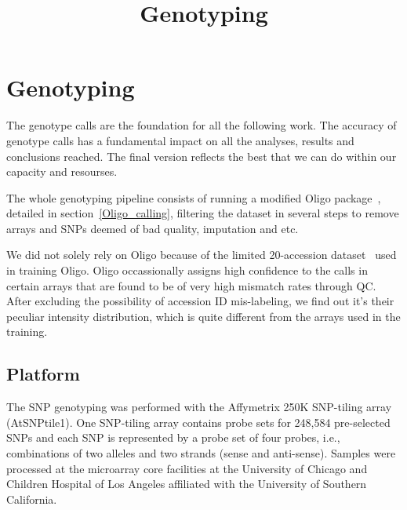 \documentclass[a4paper,10pt]{article}
\title{Genotyping}
\begin{document}
\maketitle

\begin{abstract}

\end{abstract}

\tableofcontents

\section{Genotyping}
The genotype calls are the foundation for all the following work. The accuracy of genotype calls has a fundamental impact on all the analyses, results and conclusions reached. The final version reflects the best that we can do within our capacity and resourses.

The whole genotyping pipeline consists of running a modified Oligo package~\cite{Carvalho2007}, detailed in section~\ref{Oligo_calling}, filtering the dataset in several steps to remove arrays and SNPs deemed of bad quality, imputation and etc.

We did not solely rely on Oligo because of the limited 20-accession dataset~\cite{Clark2007a} used in training Oligo. Oligo occassionally assigns high confidence to the calls in certain arrays that are found to be of very high mismatch rates through QC. After excluding the possibility of accession ID mis-labeling, we find out it's their peculiar intensity distribution, which is quite different from the arrays used in the training.

\subsection{Platform}
The SNP genotyping was performed with the Affymetrix 250K SNP-tiling array (AtSNPtile1). One SNP-tiling array contains probe sets for 248,584 pre-selected SNPs and each SNP is represented by a probe set of four probes, i.e., combinations of two alleles and two strands (sense and anti-sense). Samples were processed at the microarray core facilities at the University of Chicago and Children Hospital of Los Angeles affiliated with the University of Southern California.
\end{document}
